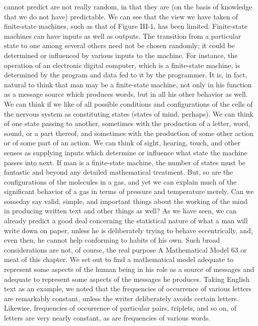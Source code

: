 cannot predict are not really random, in that they are (on the basis
of knowledge that we do not have) predictable.
We can see that the view we have taken of finite-state machines,
such as that of Figure III-1, has been limited. Finite-state machines
can have inputs as well as outputs. The transition from a particular
state to one among several others need not be chosen randomly;
it could be determined or influenced by various inputs to the
machine. For instance, the operation of an electronic digital computer,
which is a finite-state machine, is determined by the program
and data fed to it by the programmer.
It is, in fact, natural to think that man may be a finite-state
machine, not only in his function as a message source which produces
words, but in all his other behavior as well. We can think if
we like of all possible conditions and configurations of the cells of
the nervous system as constituting states (states of mind, perhaps).
We can think of one state passing to another, sometimes with the
production of a letter, word, sound, or a part thereof, and sometimes
with the production of some other action or of some part of
an action. We can think of sight, hearing, touch, and other senses
as supplying inputs which determine or influence what state the
machine passes into next. If man is a finite-state machine, the
number of states must be fantastic and beyond any detailed mathematical
treatment. But, so are the configurations of the molecules
in a gas, and yet we can explain much of the significant behavior
of a gas in terms of pressure and temperature merely.
Can we someday say valid, simple, and important things about
the working of the mind in producing written text and other things
as well? As we have seen, we can already predict a good deal
concerning the statistical nature of what a man will write down on
paper, unless he is deliberately trying to behave eccentrically, and,
even then, he cannot help conforming to habits of his own.
Such broad considerations are not, of course, the real purpose
A Mathematical Model 63
or meat of this chapter. We set out to find a mathematical model
adequate to represent some aspects of the human being in his role
as a source of messages and adequate to represent some aspects
of the messages he produces. Taking English text as an example,
we noted that the frequencies of occurrence of various letters are
remarkably constant, unless the writer deliberately avoids certain
letters. Likewise, frequencies of occurrence of particular pairs,
triplets, and so on, of letters are very nearly constant, as are
frequencies of various words.
